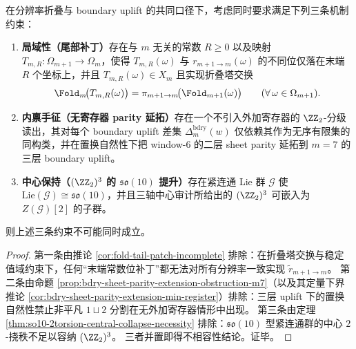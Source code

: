 \begin{theorem}\label{thm:sm-scale-lift-triple-obstruction}
在分辨率折叠与 boundary uplift 的共同口径下，考虑同时要求满足下列三条机制约束：
\begin{enumerate}
  \item \textbf{局域性（尾部补丁）}存在与 \(m\) 无关的常数 \(R\ge 0\) 以及映射 \(T_{m,R}:\Omega_{m+1}\to\Omega_m\)，使得 \(T_{m,R}(\omega)\) 与 \(r_{m+1\to m}(\omega)\) 的不同位仅落在末端 \(R\) 个坐标上，并且 \(T_{m,R}(\omega)\in X_m\) 且实现折叠塔交换
  \[
  \Fold_m\!\bigl(T_{m,R}(\omega)\bigr)=\pi_{m+1\to m}\!\bigl(\Fold_{m+1}(\omega)\bigr)\qquad(\forall\,\omega\in\Omega_{m+1}).
  \]
  \item \textbf{内禀手征（无寄存器 parity 延拓）}存在一个不引入外加寄存器的 \(\ZZ_2\)-分级读出，其对每个 boundary uplift 差集 \(\Delta_m^{\mathrm{bdry}}(w)\) 仅依赖其作为无序有限集的同构类，并在置换自然性下把 window-\(6\) 的二层 sheet parity 延拓到 \(m=7\) 的三层 boundary uplift。
  \item \textbf{中心保持（\texorpdfstring{$(\ZZ_2)^3$}{(Z2)^3} 的 \texorpdfstring{$\mathfrak{so}(10)$}{so(10)} 提升）}存在紧连通 Lie 群 \(\mathcal G\) 使 \(\mathrm{Lie}(\mathcal G)\cong \mathfrak{so}(10)\)，并且三轴中心审计所给出的 \((\ZZ_2)^3\) 可嵌入为 \(Z(\mathcal G)[2]\) 的子群。
\end{enumerate}
则上述三条约束不可能同时成立。
\end{theorem}
\begin{proof}
第一条由推论 \ref{cor:fold-tail-patch-incomplete} 排除：在折叠塔交换与稳定值域约束下，任何“末端常数位补丁”都无法对所有分辨率一致实现 \(\widetilde r_{m+1\to m}\)。
第二条由命题 \ref{prop:bdry-sheet-parity-extension-obstruction-m7}（以及其定量下界推论 \ref{cor:bdry-sheet-parity-extension-min-register}）排除：三层 uplift 下的置换自然性禁止非平凡 \(1\sqcup 2\) 分割在无外加寄存器情形中出现。
第三条由定理 \ref{thm:so10-2torsion-central-collapse-necessity} 排除：\(\mathfrak{so}(10)\) 型紧连通群的中心 \(2\)-挠秩不足以容纳 \((\ZZ_2)^3\)。
三者并置即得不相容性结论。证毕。
\end{proof}
